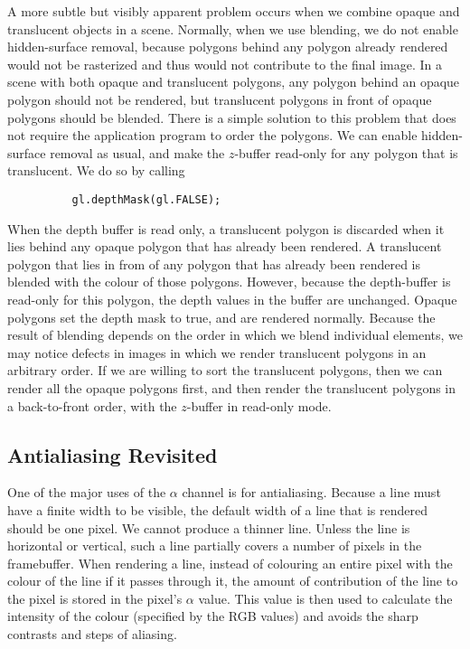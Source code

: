 \documentclass[../COS3712_Notes.tex]{subfiles}
\begin{document}
        A more subtle but visibly apparent problem occurs when we combine opaque and translucent
        objects in a scene.
        Normally, when we use blending, we do not enable hidden-surface removal,
        because polygons behind any polygon already rendered would not be rasterized
        and thus would not contribute to the final image.
        In a scene with both opaque and translucent polygons, any polygon behind an opaque
        polygon should not be rendered, but translucent polygons in front of opaque
        polygons should be blended.
        There is a simple solution to this problem that does not require the application program
        to order the polygons.
        We can enable hidden-surface removal as usual, and make the $z$-buffer read-only
        for any polygon that is translucent.
        We do so by calling
        \begin{verbatim}
          gl.depthMask(gl.FALSE);
        \end{verbatim}
        When the depth buffer is read only, a translucent polygon is discarded when it lies
        behind any opaque polygon that has already been rendered.
        A translucent polygon that lies in from of any polygon that has already been rendered
        is blended with the colour of those polygons.
        However, because the depth-buffer is read-only for this polygon,
        the depth values in the buffer are unchanged.
        Opaque polygons set the depth mask to true, and are rendered normally.
        Because the result of blending depends on the order in which we blend individual elements,
        we may notice defects in images in which we render translucent polygons in an arbitrary
        order.
        If we are willing to sort the translucent polygons, then we can render all the opaque
        polygons first, and then render the translucent polygons in a back-to-front order,
        with the $z$-buffer in read-only mode.

      \subsection{Antialiasing Revisited}
        One of the major uses of the $\alpha$ channel is for antialiasing.
        Because a line must have a finite width to be visible, the default width of a line
        that is rendered should be one pixel.
        We cannot produce a thinner line.
        Unless the line is horizontal or vertical, such a line partially covers a number
        of pixels in the framebuffer.
        When rendering a line, instead of colouring an entire pixel with the colour of the line
        if it passes through it, the amount of contribution of the line to the pixel is stored
        in the pixel's $\alpha$ value.
        This value is then used to calculate the intensity of the colour
        (specified by the RGB values)
        and avoids the sharp contrasts and steps of aliasing.
\end{document}
